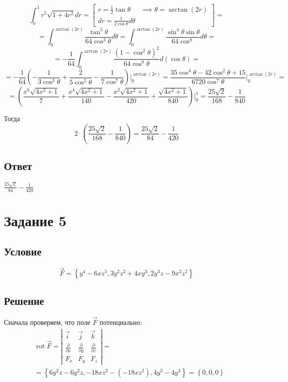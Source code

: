 \documentclass{report}
\newcommand*\task[1]{
       \chapter{#1}
       \section{Условие}
}
\newcommand*\partialofby[2]{\frac{\partial #1}{\partial #2}}
\begin{document}
$$
    \int_{0}^{1} r^5 \sqrt{1 + 4r^2} dr = \left[ \begin{matrix}
            r = \frac{1}{2}\tan \theta            & \implies \theta = \arctan(2r) \\
            dr = \frac{1}{2 \cos \theta} d \theta &
        \end{matrix} \right] =
$$
$$
    = \int_{0}^{\arctan(2r)} \frac{\tan^5 \theta}{ 64 \cos^3 \theta} d \theta =
    \int_{0}^{\arctan(2r)} \frac{\sin^4 \theta \sin \theta}{ 64 \cos^8 } d\theta =
$$
$$
    = -\frac{1}{64} \int_{0}^{\arctan(2r)} \frac{(1 - \cos^2 \theta)^2}
    {64 \cos^8 \theta} d(\cos \theta) =
$$
$$
    = -\frac{1}{64}\left(
    - \frac{1}{3 \cos^3 \theta}
    + \frac{2}{5 \cos^5 \theta}
    - \frac{1}{7 \cos^7 \theta}
    \right) \Biggr|_{0}^{\arctan(2r)} = \frac{35 \cos^4 \theta - 42 \cos^2 \theta + 15}
    {6720 \cos^7 \theta}\Biggr|_{0}^{\arctan(2r)} =
$$
$$
    = \left( \frac{x^6 \sqrt{4x^2 + 1}}{7} + \frac{x^4 \sqrt{4x^2 + 1}}{140} - \frac{x^2 \sqrt{4x^2 + 1}}{420} + \frac{\sqrt{4x^2 + 1}}{840} \right)\Biggr|_{0}^{1} = \frac{25\sqrt{2}}{168} - \frac{1}{840}
$$

Тогда
$$
    2 \cdot \left(\frac{25\sqrt{2}}{168} - \frac{1}{840}\right) = \frac{25\sqrt{2}}{84} - \frac{1}{420}
$$

\section{Ответ}

$\frac{25\sqrt{2}}{84} - \frac{1}{420}$

\task{Задание 5}

\begin{equation}
    \label{5:usl}
    \vec{F} = \left\{ y^4 - 6xz^3, 3y^2z^2 + 4xy^3, 2y^3z - 9x^2z^2 \right\}
\end{equation}

\section{Решение}

Сначала проверяем, что поле $\vec{F}$ потенциально:
\begin{align*}
     & \operatorname{rot} \vec{F} = \left| \begin{matrix}
                                               \vec{i}           & \vec{j}           & \vec{k}           \\
                                               \partialofby{}{x} & \partialofby{}{y} & \partialofby{}{z} \\
                                               F_x               & F_y               & F_z
                                           \end{matrix} \right| = \\
     & = \left\{ 6y^2z - 6y^2z, -18xz^2 - (-18xz^2), 4y^3 - 4y^3 \right\} = \left\{ 0, 0, 0 \right\}
\end{align*}
\end{document}
